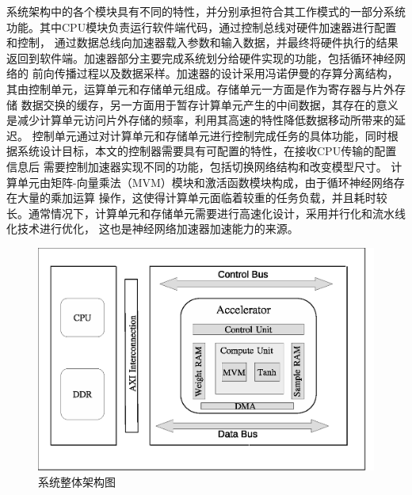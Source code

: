 系统架构中的各个模块具有不同的特性，并分别承担符合其工作模式的一部分系统功能。其中CPU模块负责运行软件端代码，通过控制总线对硬件加速器进行配置和控制，
通过数据总线向加速器载入参数和输入数据，并最终将硬件执行的结果返回到软件端。加速器部分主要完成系统划分给硬件实现的功能，包括循环神经网络的
前向传播过程以及数据采样。加速器的设计采用冯诺伊曼的存算分离结构，其由控制单元，运算单元和存储单元组成。存储单元一方面是作为寄存器与片外存储
数据交换的缓存，另一方面用于暂存计算单元产生的中间数据，其存在的意义是减少计算单元访问片外存储的频率，利用其高速的特性降低数据移动所带来的延迟。
控制单元通过对计算单元和存储单元进行控制完成任务的具体功能，同时根据系统设计目标，本文的控制器需要具有可配置的特性，在接收CPU传输的配置信息后
需要控制加速器实现不同的功能，包括切换网络结构和改变模型尺寸。 计算单元由矩阵-向量乘法（MVM）模块和激活函数模块构成，由于循环神经网络存在大量的乘加运算
操作，这使得计算单元面临着较重的任务负载，并且耗时较长。通常情况下，计算单元和存储单元需要进行高速化设计，采用并行化和流水线化技术进行优化，
这也是神经网络加速器加速能力的来源。
\begin{figure}
	\centering
	\includegraphics[width=0.8\columnwidth]{exp/fig_systemArch2.eps}
	\caption{系统整体架构图}
	\label{fig:sysArch}
\end{figure}

